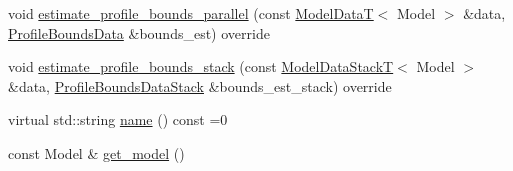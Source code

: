 \begin{DoxyCompactItemize}
\item 
void \hyperlink{classmappel_1_1estimator_1_1ThreadedEstimator_a518454a427336c48a83d145b917ec3f7}{estimate\+\_\+profile\+\_\+bounds\+\_\+parallel} (const \hyperlink{namespacemappel_a97f050df953605381ae9c901c3b125f1}{Model\+DataT}$<$ Model $>$ \&data, \hyperlink{structmappel_1_1estimator_1_1ProfileBoundsData}{Profile\+Bounds\+Data} \&bounds\+\_\+est) override
\item 
void \hyperlink{classmappel_1_1estimator_1_1ThreadedEstimator_a3701a1dcbe15b6b8c35c15c929d7429a}{estimate\+\_\+profile\+\_\+bounds\+\_\+stack} (const \hyperlink{namespacemappel_aaeb6665bc57476dd93c2df6ad8bc4768}{Model\+Data\+StackT}$<$ Model $>$ \&data, \hyperlink{structmappel_1_1estimator_1_1ProfileBoundsDataStack}{Profile\+Bounds\+Data\+Stack} \&bounds\+\_\+est\+\_\+stack) override
\item 
virtual std\+::string \hyperlink{classmappel_1_1estimator_1_1Estimator_a9f156286a85938814b9eb0261c7e46ce}{name} () const =0
\item 
const Model \& \hyperlink{classmappel_1_1estimator_1_1Estimator_a076f485dfe0a925e01520c173f6fffe4}{get\+\_\+model} ()
\end{DoxyCompactItemize}
{\bf }\par
